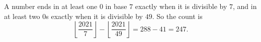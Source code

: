A number ends in at least one $0$ in base $7$ exactly when it is divisible by $7$, and in at least two $0$s exactly when it is divisible by $49$. So the count is
\[\left\lfloor\dfrac{2021}{7}\right\rfloor-\left\lfloor\dfrac{2021}{49}\right\rfloor=288-41=\boxed{247}.\]
